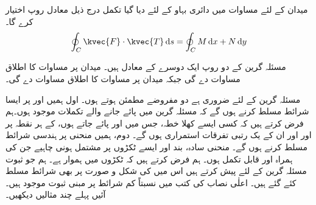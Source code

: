 میدان  کے لئے  مساوات  میں دائری بہاو کے لئے دیا گیا تکمل درج ذیل معادل روپ اختیار کرے گا۔
\begin{align*}
\oint_C\kvec{F}\cdot \kvec{T}\dif s=\oint_C M\dif x+N\dif y
\end{align*}

مسئلہ گرین کے دو روپ ایک دوسرے کے  معادل ہیں۔ میدان  پر مساوات  کا اطلاق مساوات  دے گی جبکہ میدان  پر مساوات  کا اطلاق مساوات  دے گی۔

مسئلہ گرین کے لئے ضروری ہے  دو مفروضے مطمئن ہوتے ہوں۔ اول ہمیں  اور  پر ایسا شرائط مسلط کرنے ہوں گے کہ مسئلہ گرین میں پائے جانے والے تکملات موجود ہوں۔ہم فرض کرتے ہیں کہ کسی ایسے کھلا خطہ، جس میں  اور  پائے جاتے ہوں، کے ہر نقطہ پر  اور  اور ان کے یک رتبی تفرقات استمراری ہوں گے۔ دوم، ہمیں منحنی  پر ہندسی شرائط مسلط کرنے ہوں گے۔ منحنی سادہ، بند اور ایسے  ٹکڑوں پر مشتمل ہونی چاہیے جن کی ہمراہ  اور  قابل تکمل ہوں۔ ہم فرض کرتے ہیں کہ  ٹکڑوں میں ہموار ہے۔ ہم جو ثبوت  مسئلہ گرین کے لئے پیش کرتے ہیں اس میں  کی شکل و صورت پر بھی شرائط مسلط کئے گئے ہیں۔ اعلٰی نصاب کی کتب میں نسبتاً کم شرائط پر مبنی ثبوت موجود ہیں۔ آئیں پہلے چند مثالیں دیکھیں۔

